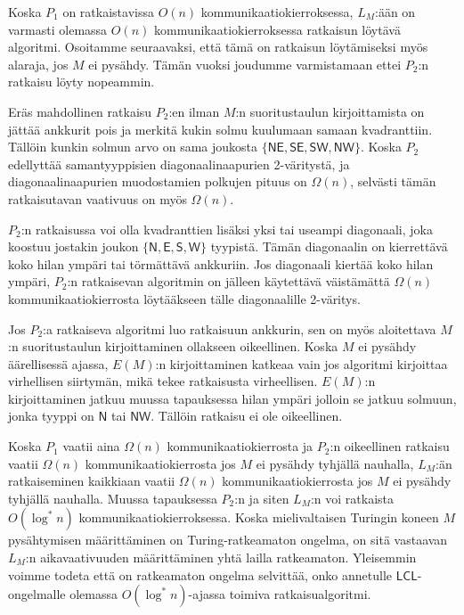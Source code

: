\documentclass[12pt,finnish]{tktltiki2}
\theoremstyle{definition}
\theoremstyle{remark}
\newcommand*{\lcl}{\ensuremath{\mathsf{LCL}}}
\begin{document}
Koska $P_1$ on ratkaistavissa $O(n)$ kommunikaatiokierroksessa, $L_M$:ään on varmasti olemassa $O(n)$ kommunikaatiokierroksessa ratkaisun löytävä algoritmi. Osoitamme seuraavaksi, että tämä on ratkaisun löytämiseksi myös alaraja, jos $M$ ei pysähdy. Tämän vuoksi joudumme varmistamaan ettei $P_2$:n ratkaisu löyty nopeammin.

Eräs mahdollinen ratkaisu $P_2$:en ilman $M$:n suoritustaulun kirjoittamista on jättää ankkurit pois ja merkitä kukin solmu kuulumaan samaan kvadranttiin. Tällöin kunkin solmun arvo on sama joukosta $\{\mathsf{NE}, \mathsf{SE},\mathsf{SW},\mathsf{NW}\}$. Koska $P_2$ edellyttää samantyyppisien diagonaalinaapurien 2-väritystä, ja diagonaalinaapurien muodostamien polkujen pituus on $\Omega(n)$, selvästi tämän ratkaisutavan vaativuus on myös $\Omega(n)$.

$P_2$:n ratkaisussa voi olla kvadranttien lisäksi yksi tai useampi diagonaali, joka koostuu jostakin joukon $\{\mathsf{N}, \mathsf{E},\mathsf{S},\mathsf{W}\}$ tyypistä. Tämän diagonaalin on kierrettävä koko hilan ympäri tai törmättävä ankkuriin. Jos diagonaali kiertää koko hilan ympäri, $P_2$:n ratkaisevan algoritmin on jälleen käytettävä väistämättä $\Omega(n)$ kommunikaatiokierrosta löytääkseen tälle diagonaalille 2-väritys.

Jos $P_2$:a ratkaiseva algoritmi luo ratkaisuun ankkurin, sen on myös aloitettava $M$:n suoritustaulun kirjoittaminen ollakseen oikeellinen. Koska $M$ ei pysähdy äärellisessä ajassa, $E(M)$:n kirjoittaminen katkeaa vain jos algoritmi kirjoittaa virhellisen siirtymän, mikä tekee ratkaisusta virheellisen. $E(M)$:n kirjoittaminen jatkuu muussa tapauksessa hilan ympäri jolloin se jatkuu solmuun, jonka tyyppi on $\mathsf{N}$ tai $\mathsf{NW}$. Tällöin ratkaisu ei ole oikeellinen.

Koska $P_1$ vaatii aina $\Omega(n)$ kommunikaatiokierrosta ja $P_2$:n oikeellinen ratkaisu vaatii $\Omega(n)$ kommunikaatiokierrosta jos $M$ ei pysähdy tyhjällä nauhalla, $L_M$:än ratkaiseminen kaikkiaan vaatii $\Omega(n)$ kommunikaatiokierrosta jos $M$ ei pysähdy tyhjällä nauhalla. Muussa tapauksessa $P_2$:n ja siten $L_M$:n voi ratkaista $O(\log^* n)$ kommunikaatiokierroksessa. Koska mielivaltaisen Turingin koneen $M$ pysähtymisen määrittäminen on Turing-ratkeamaton ongelma, on sitä vastaavan $L_M$:n aikavaativuuden määrittäminen yhtä lailla ratkeamaton. Yleisemmin voimme todeta että on ratkeamaton ongelma selvittää, onko annetulle \lcl -ongelmalle olemassa $O(\log^* n)$-ajassa toimiva ratkaisualgoritmi.
\end{document}
